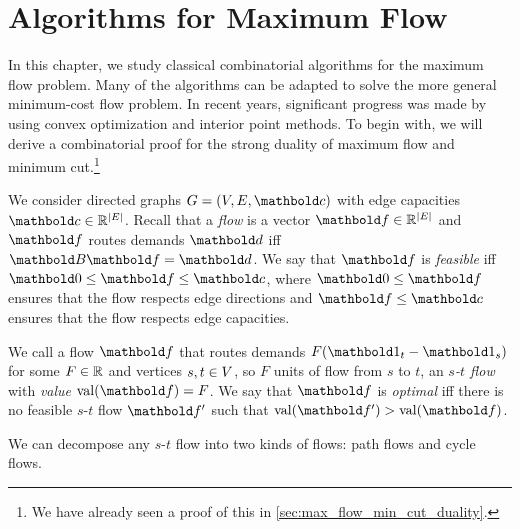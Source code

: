 
\chapter{Algorithms for Maximum Flow}

In this chapter, we study classical combinatorial algorithms for the maximum flow problem. Many of the algorithms can be adapted to solve the more general minimum-cost flow problem. In recent years, significant progress was made by using convex optimization and interior point methods. To begin with, we will derive a combinatorial proof for the strong duality of maximum flow and minimum cut.\footnote{We have already seen a proof of this in \cref{sec:max_flow_min_cut_duality}.}

We consider directed graphs $G = (V, E, \vc)$ with edge capacities $\vc \in \R^{|\sE|}$. Recall that a \emph{flow} is a vector $\vf \in \R^{|\sE|}$ and $\vf$ routes demands $\vd$ iff $\mB\vf = \vd$. We say that $\vf$ is \emph{feasible} iff $\vZero \leq \vf \leq \vc$, where $\vZero \leq \vf$ ensures that the flow respects edge directions and $\vf \leq \vc$ ensures that the flow respects edge capacities.

We call a flow $\vf$ that routes demands $F(\vOne_t - \vOne_s)$ for some $F \in \mathbb{R}$ and vertices $s,t \in V$, so $F$ units of flow from $s$ to $t$, an \emph{$s$-$t$ flow} with \emph{value} $\val(\vf) = F$. We say that $\vf$ is \emph{optimal} iff there is no feasible $s$-$t$ flow $\vf'$ such that $\val(\vf') > \val(\vf)$.

We can decompose any $s$-$t$ flow into two kinds of flows: path flows and cycle flows.


